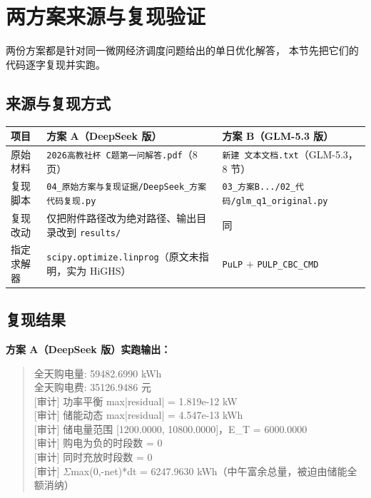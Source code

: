 \documentclass[12pt,a4paper]{ctexart}
\begin{document}
\section{两方案来源与复现验证}

两份方案都是针对同一微网经济调度问题\cite{lasseter,katiraei,wang}给出的单日优化解答，
本节先把它们的代码逐字复现并实跑。

\subsection{来源与复现方式}

\begin{center}
\small
\begin{tabular}{@{}p{2.4cm} p{6.4cm} p{6.4cm}@{}}
\toprule
项目 & 方案 A（DeepSeek 版） & 方案 B（GLM-5.3 版） \\
\midrule
原始材料 & \texttt{2026高教社杯 C题第一问解答.pdf}（8 页） & \texttt{新建 文本文档.txt}（GLM-5.3，8 节）\\
复现脚本 & \texttt{04\_原始方案与复现证据/DeepSeek\_方案代码复现.py} & \texttt{03\_方案B.../02\_代码/glm\_q1\_original.py}\\
复现改动 & 仅把附件路径改为绝对路径、输出目录改到 \texttt{results/} & 同 \\
指定求解器 & \texttt{scipy.optimize.linprog}（原文未指明，实为 HiGHS） & \texttt{PuLP} $+$ \texttt{PULP\_CBC\_CMD}\\
\bottomrule
\end{tabular}
\end{center}

\subsection{复现结果}

\textbf{方案 A（DeepSeek 版）实跑输出：}

\begin{quote}\ttfamily\small
全天购电量: 59482.6990 kWh\\
全天购电费: 35126.9486 元\\
{[}审计{]} 功率平衡 max|residual| = 1.819e-12 kW\\
{[}审计{]} 储能动态 max|residual| = 4.547e-13 kWh\\
{[}审计{]} 储电量范围 [1200.0000, 10800.0000]，E\_T = 6000.0000\\
{[}审计{]} 购电为负的时段数 = 0\\
{[}审计{]} 同时充放时段数 = 0\\
{[}审计{]} $\Sigma$max(0,-net)*dt = 6247.9630 kWh（中午富余总量，被迫由储能全额消纳）
\end{quote}
\end{document}
